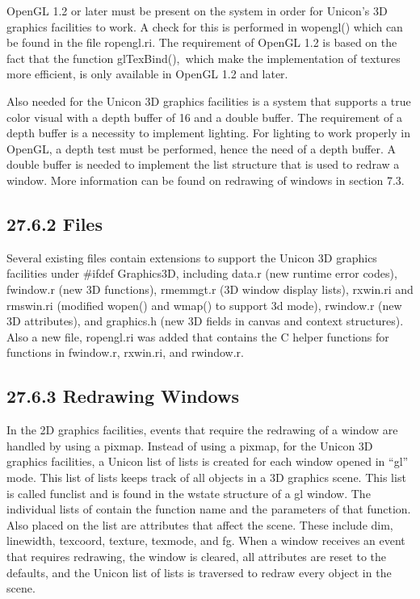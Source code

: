 OpenGL 1.2 or later must be present on the system in order for
Unicon's 3D graphics facilities to work. A check for this is performed
in \textsf{wopengl()} which can be found in the file
\textsf{ropengl.ri}. The requirement of OpenGL 1.2 is based on the
fact that the function \textsf{glTexBind(),}\texttt{ }which make the
implementation of textures more efficient, is only available in OpenGL
1.2 and later.

Also needed for the Unicon 3D graphics facilities is a system that
supports a true color visual with a depth buffer of 16 and a double
buffer. The requirement of a depth buffer is a necessity to implement
lighting. For lighting to work properly in OpenGL, a depth test must
be performed, hence the need of a depth buffer. A double buffer is
needed to implement the list structure that is used to redraw a
window. More information can be found on redrawing of windows in
section 7.3.

\subsection[27.6.2 Files]{27.6.2 Files}

Several existing files contain extensions to support the Unicon 3D
graphics facilities under \#ifdef Graphics3D, including data.r (new
runtime error codes), fwindow.r (new 3D functions), rmemmgt.r (3D
window display lists), rxwin.ri and rmswin.ri (modified wopen() and
wmap() to support 3d mode), rwindow.r (new 3D attributes), and
graphics.h (new 3D fields in canvas and context structures). Also a
new file, ropengl.ri was added that contains the C helper functions
for functions in \textsf{fwindow.r, rxwin.ri}, and \textsf{rwindow.r}.

\subsection[27.6.3 Redrawing Windows]{27.6.3 Redrawing Windows}

In the 2D graphics facilities, events that require the redrawing of a
window are handled by using a pixmap. Instead of using a pixmap, for
the Unicon 3D graphics facilities, a Unicon list of lists is created
for each window opened in \textsf{{}``gl''} mode. This list of lists
keeps track of all objects in a 3D graphics scene. This list is called
\textsf{funclist} and is found in the wstate structure of a
\textsf{{\textquotedbl}gl{\textquotedbl}} window. The individual lists
of contain the function name and the parameters of that function. Also
placed on the list are attributes that affect the scene. These include
\textsf{dim}, \textsf{linewidth}, \textsf{texcoord}, \textsf{texture},
\textsf{texmode}, and \textsf{fg}. When a window receives an event
that requires redrawing, the window is cleared, all attributes are
reset to the defaults, and the Unicon list of lists is traversed to
redraw every object in the scene.

